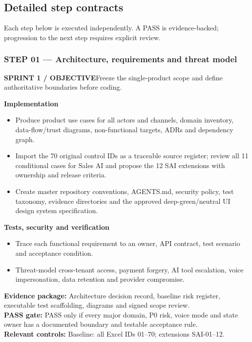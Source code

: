 \documentclass[10.5pt,a4paper,oneside]{article}
\newcommand{\eyebrow}[1]{{\sffamily\footnotesize\bfseries\color{gold}\MakeUppercase{#1}}}
\newcommand{\tinyhint}[1]{{\sffamily\footnotesize\color{graytext}#1}}
\begin{document}
\subsection{Detailed step contracts}
\tinyhint{Each step below is executed independently. A PASS is evidence-backed; progression to the next step requires explicit review.}
\Needspace{100mm}
\subsubsection*{STEP 01 --- Architecture, requirements and threat model}
\eyebrow{Sprint 1 / objective}\quad Freeze the single-product scope and define authoritative boundaries before coding.
\begin{tcolorbox}[colback=warm,colframe=line,boxrule=.45pt,arc=2pt,left=8pt,right=8pt,top=6pt,bottom=6pt]\textbf{Implementation}
\begin{itemize}
\item Produce product use cases for all actors and channels, domain inventory, data-flow/trust diagrams, non-functional targets, ADRs and dependency graph.
\item Import the 70 original control IDs as a traceable source register; review all 11 conditional cases for Sales AI and propose the 12 SAI extensions with ownership and release criteria.
\item Create master repository conventions, AGENTS.md, security policy, test taxonomy, evidence directories and the approved deep-green/neutral UI design system specification.
\end{itemize}
\textbf{Tests, security and verification}
\begin{itemize}
\item Trace each functional requirement to an owner, API contract, test scenario and acceptance condition.
\item Threat-model cross-tenant access, payment forgery, AI tool escalation, voice impersonation, data retention and provider compromise.
\end{itemize}
\textbf{Evidence package:} Architecture decision record, baseline risk register, executable test scaffolding, diagrams and signed scope review.\\
\textbf{PASS gate:} PASS only if every major domain, P0 risk, voice mode and state owner has a documented boundary and testable acceptance rule.\\
\textbf{Relevant controls:} Baseline: all Excel IDs 01--70; extensions SAI-01--12.
\end{tcolorbox}
\Needspace{100mm}
\end{document}
